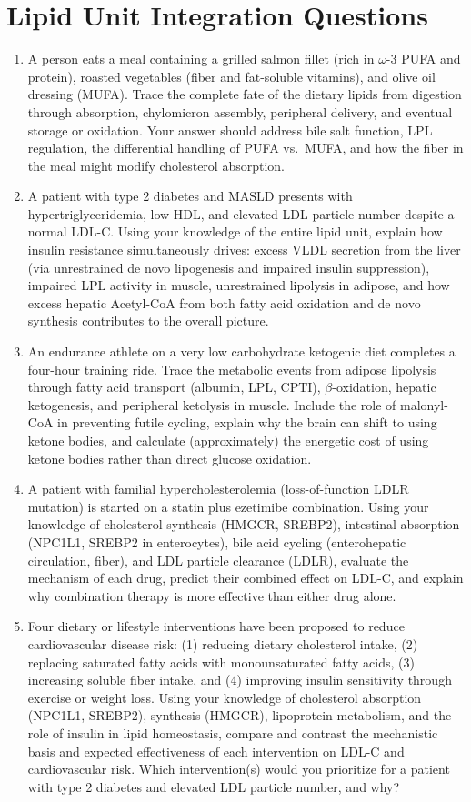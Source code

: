 \documentclass{tufte-handout}
\begin{document}
\section{Lipid Unit Integration Questions}
\begin{enumerate}
\item A person eats a meal containing a grilled salmon fillet (rich in $\omega$-3 PUFA and protein), roasted vegetables (fiber and fat-soluble vitamins), and olive oil dressing (MUFA). Trace the complete fate of the dietary lipids from digestion through absorption, chylomicron assembly, peripheral delivery, and eventual storage or oxidation. Your answer should address bile salt function, LPL regulation, the differential handling of PUFA vs.\ MUFA, and how the fiber in the meal might modify cholesterol absorption.
\item A patient with type 2 diabetes and MASLD presents with hypertriglyceridemia, low HDL, and elevated LDL particle number despite a normal LDL-C. Using your knowledge of the entire lipid unit, explain how insulin resistance simultaneously drives: excess VLDL secretion from the liver (via unrestrained de novo lipogenesis and impaired insulin suppression), impaired LPL activity in muscle, unrestrained lipolysis in adipose, and how excess hepatic Acetyl-CoA from both fatty acid oxidation and de novo synthesis contributes to the overall picture.
\item An endurance athlete on a very low carbohydrate ketogenic diet completes a four-hour training ride. Trace the metabolic events from adipose lipolysis through fatty acid transport (albumin, LPL, CPTI), $\beta$-oxidation, hepatic ketogenesis, and peripheral ketolysis in muscle. Include the role of malonyl-CoA in preventing futile cycling, explain why the brain can shift to using ketone bodies, and calculate (approximately) the energetic cost of using ketone bodies rather than direct glucose oxidation.
\item A patient with familial hypercholesterolemia (loss-of-function LDLR mutation) is started on a statin plus ezetimibe combination. Using your knowledge of cholesterol synthesis (HMGCR, SREBP2), intestinal absorption (NPC1L1, SREBP2 in enterocytes), bile acid cycling (enterohepatic circulation, fiber), and LDL particle clearance (LDLR), evaluate the mechanism of each drug, predict their combined effect on LDL-C, and explain why combination therapy is more effective than either drug alone.
\item Four dietary or lifestyle interventions have been proposed to reduce cardiovascular disease risk: (1) reducing dietary cholesterol intake, (2) replacing saturated fatty acids with monounsaturated fatty acids, (3) increasing soluble fiber intake, and (4) improving insulin sensitivity through exercise or weight loss. Using your knowledge of cholesterol absorption (NPC1L1, SREBP2), synthesis (HMGCR), lipoprotein metabolism, and the role of insulin in lipid homeostasis, compare and contrast the mechanistic basis and expected effectiveness of each intervention on LDL-C and cardiovascular risk. Which intervention(s) would you prioritize for a patient with type 2 diabetes and elevated LDL particle number, and why?

\end{enumerate}
\end{document}
